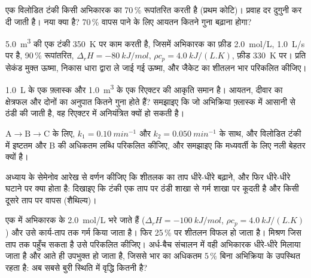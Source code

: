 \begin{exercise}[$\star\star$]\label{exo:b2:continuous-reactors:7}
एक विलोडित टंकी किसी अभिकारक का 70\,\% रूपांतरित करती है (प्रथम कोटि)। प्रवाह दर
दुगुनी कर दी जाती है। नया  क्या है? 70\,\% वापस पाने के लिए आयतन
कितने गुना बढ़ाना होगा?
\end{exercise}

\begin{exercise}[$\star\star$]\label{exo:b2:continuous-reactors:8}
\qty{5.0}{m^3} की एक टंकी \qty{350}{K} पर काम करती है, जिसमें अभिकारक का फ़ीड
\qty{2.0}{mol/L}, \qty{1.0}{L/s} पर है, 90\,\% रूपांतरित, $\Delta_r H
= \qty{-80}{kJ/mol}$, $\rho c_p = \qty{4.0}{kJ/(L.K)}$, फ़ीड \qty{330}{K} पर।
प्रति सेकंड मुक्त ऊष्मा, निकास धारा द्वारा ले जाई गई ऊष्मा,
और जैकेट का शीतलन भार परिकलित कीजिए।
\end{exercise}

\begin{exercise}[$\star\star$]\label{exo:b2:continuous-reactors:9}
\qty{1.0}{L} के एक फ़्लास्क और \qty{1.0}{m^3} के एक रिएक्टर की आकृति समान है।
आयतन, दीवार का क्षेत्रफल और दोनों का अनुपात कितने गुना होते हैं?
समझाइए कि जो अभिक्रिया फ़्लास्क में आसानी से ठंडी की जाती है, वह रिएक्टर में
अनियंत्रित क्यों हो सकती है।
\end{exercise}

\begin{exercise}[$\star\star\star$]\label{exo:b2:continuous-reactors:10}
$\mathrm A \to \mathrm B \to \mathrm C$ के लिए, $k_1 = \qty{0.10}{min^{-1}}$
और $k_2 = \qty{0.050}{min^{-1}}$ के साथ,
 और विलोडित टंकी में इष्टतम  और
B की अधिकतम लब्धि परिकलित कीजिए, और समझाइए कि मध्यवर्ती के लिए नली बेहतर क्यों है।
\end{exercise}

\begin{exercise}[$\star\star\star$]\label{exo:b2:continuous-reactors:11}
अध्याय के सेमेनोव आरेख से वर्णन कीजिए कि शीतलक का ताप धीरे-धीरे
बढ़ाने, और फिर धीरे-धीरे घटाने पर क्या होता है: दिखाइए कि
टंकी एक ताप पर ठंडी शाखा से गर्म शाखा पर कूदती है और किसी दूसरे ताप पर वापस
(शैथिल्य)।
\end{exercise}

\begin{exercise}[$\star\star\star$]\label{exo:b2:continuous-reactors:12}
एक  में अभिकारक के \qty{2.0}{mol/L} भरे जाते हैं ($\Delta_r H =
\qty{-100}{kJ/mol}$, $\rho c_p = \qty{4.0}{kJ/(L.K)}$) और उसे
कार्य-ताप तक गर्म किया जाता है। फिर 25\,\%  पर शीतलन विफल हो जाता है। मिश्रण
जिस ताप तक पहुँच सकता है उसे परिकलित कीजिए। अर्ध-बैच संचालन में वही
अभिकारक धीरे-धीरे मिलाया जाता है और आते ही उपभुक्त हो जाता है, जिससे भार का अधिकतम 5\,\%
बिना अभिक्रिया के उपस्थित रहता है: अब सबसे बुरी स्थिति में वृद्धि कितनी है?
\end{exercise}

